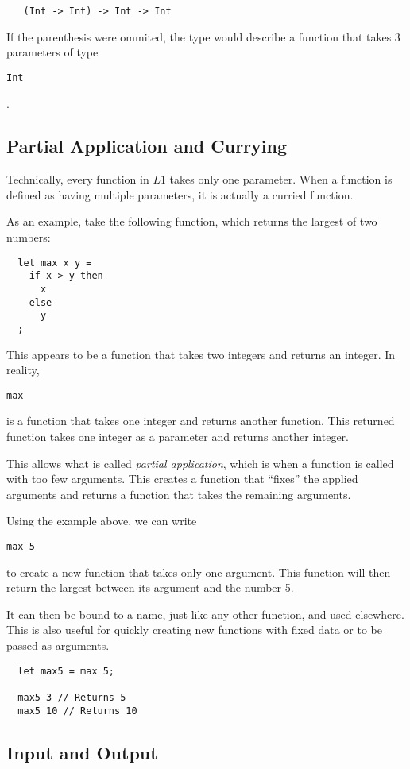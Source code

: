 \documentclass{article}
\def\code#1{\begin{footnotesize}\texttt{#1}\end{footnotesize}}
\begin{document}
 \begin{lstlisting}
   (Int -> Int) -> Int -> Int
 \end{lstlisting}

If the parenthesis were ommited, the type would describe a function that takes 3 parameters of type \code{Int}.

\subsection{Partial Application and Currying}

Technically, every function in $L1$ takes only one parameter.
When a function is defined as having multiple parameters, it is actually a curried function.

As an example, take the following function, which returns the largest of two numbers:

\begin{lstlisting}
  let max x y =
    if x > y then
      x
    else
      y
  ;
\end{lstlisting}

This appears to be a function that takes two integers and returns an integer.
In reality, \code{max} is a function that takes one integer and returns another function.
This returned function takes one integer as a parameter and returns another integer.

This allows what is called \emph{partial application}, which is when a function is called with too few arguments.
This creates a function that ``fixes'' the applied arguments and returns a function that takes the remaining arguments.

Using the example above, we can write \code{max 5} to create a new function that takes only one argument.
This function will then return the largest between its argument and the number 5.

It can then be bound to a name, just like any other function, and used elsewhere.
This is also useful for quickly creating new functions with fixed data or to be passed as arguments.

\begin{lstlisting}
  let max5 = max 5;

  max5 3 // Returns 5
  max5 10 // Returns 10
\end{lstlisting}

\subsection{Input and Output}
\end{document}
